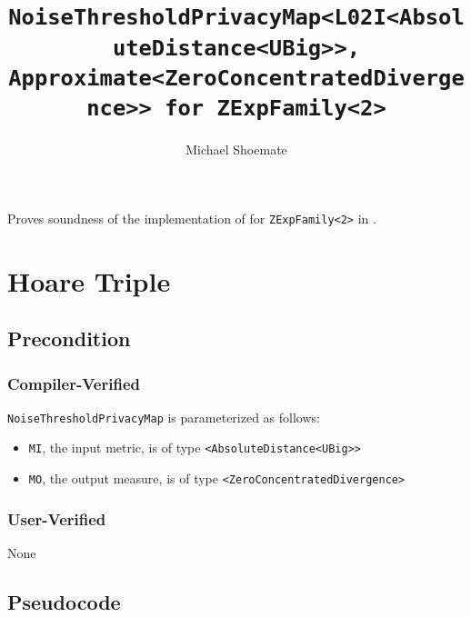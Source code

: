 \documentclass{article}
\title{\texttt{NoiseThresholdPrivacyMap<L02I<AbsoluteDistance<UBig>>, Approximate<ZeroConcentratedDivergence>> for ZExpFamily<2>}}
\author{Michael Shoemate}
\date{}
\begin{document}
\maketitle

\contrib
Proves soundness of the implementation of  for \texttt{ZExpFamily<2>} in .

\section{Hoare Triple}
\subsection*{Precondition}
\subsubsection*{Compiler-Verified}
\texttt{NoiseThresholdPrivacyMap} is parameterized as follows:
\begin{itemize}
    \item \texttt{MI}, the input metric, is of type \texttt{<AbsoluteDistance<UBig>>}
    \item \texttt{MO}, the output measure, is of type \texttt{<ZeroConcentratedDivergence>}
\end{itemize}

\subsubsection*{User-Verified}
None

\subsection*{Pseudocode}

\end{document}
